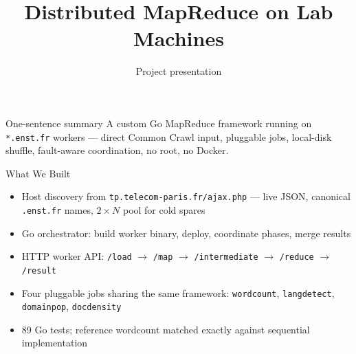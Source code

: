 \documentclass[aspectratio=169,10pt]{beamer}
\title[Distributed MapReduce]{Distributed MapReduce on Lab Machines}
\author{Project presentation}
\date{}
\begin{document}
\begin{frame}
  \titlepage

  \vspace{-0.5em}
  \begin{block}{One-sentence summary}
    A custom Go MapReduce framework running on \texttt{*.enst.fr} workers — direct Common Crawl input, pluggable jobs, local-disk shuffle, fault-aware coordination, no root, no Docker.
  \end{block}
\end{frame}

\begin{frame}{What We Built}
  \begin{itemize}
    \item Host discovery from \texttt{tp.telecom-paris.fr/ajax.php} — live JSON, canonical \texttt{.enst.fr} names, $2\times N$ pool for cold spares
    \item Go orchestrator: build worker binary, deploy, coordinate phases, merge results
    \item HTTP worker API: \texttt{/load} $\to$ \texttt{/map} $\to$ \texttt{/intermediate} $\to$ \texttt{/reduce} $\to$ \texttt{/result}
    \item Four pluggable jobs sharing the same framework: \texttt{wordcount}, \texttt{langdetect}, \texttt{domainpop}, \texttt{docdensity}
    \item 89 Go tests; reference wordcount matched exactly against sequential implementation
  \end{itemize}
\end{frame}
\end{document}

